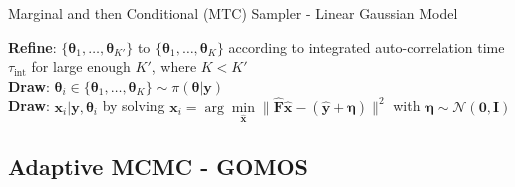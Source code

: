 \begin{algorithm}[!thb]
    \caption{Marginal and then Conditional (MTC) Sampler - Linear Gaussian Model}
    \label{alg:MTC}
    \SetAlgoLined
    \textbf{Refine}: $\{ \bm{\theta}_{1}, \dots ,\bm{\theta}_{K'}\}$ to $\{ \bm{\theta}_{1}, \dots ,\bm{\theta}_{K}\}$  according to integrated auto-correlation time $\tau_{\text{int}}$ for large enough $K'$, where $K< K'$\\
    \textbf{Draw}: $\bm{\theta}_{i} \in \{ \bm{\theta}_{1}, \dots ,\bm{\theta}_{K}\} \sim \pi(\bm{\theta}| \bm{y})$ \\
    \textbf{Draw}: $\bm{x}_i | \bm{y}, \bm{\theta}_{i}$ by solving $  \bm{x}_i = \arg \underset{\hat{\bm{x}}}{\min} \lVert \hat{\bm{F}} \hat{\bm{x}} - ( \hat{\bm{y}} + \bm{\eta} ) \rVert^2$ with $\bm{\eta} \sim \mathcal{N}(\bm{0}, \mathbf{I})$
\end{algorithm}



\subsection{Adaptive MCMC - GOMOS}
\label{subsec:GOMOS}








